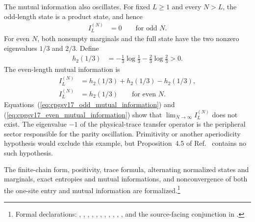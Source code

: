 \documentclass[11pt]{article}
\begin{document}
The mutual information also oscillates. For fixed $L\geq1$ and every $N>L$,
the odd-length state is a product state, and hence
\begin{align}
    I_L^{(N)}
        &= 0
        \qquad\text{for odd $N$}.
    \label{eq:cpgsv17_odd_mutual_information}
\end{align}
For even $N$, both nonempty marginals and the full state have the two nonzero
eigenvalues $1/3$ and $2/3$. Define
\begin{align}
    h_2(1/3)
        &=
        -\frac13\log\frac13
        -\frac23\log\frac23
        >0.
    \label{eq:cpgsv17_binary_entropy_one_third}
\end{align}
The even-length mutual information is
\begin{align}
    I_L^{(N)}
        &=
        h_2(1/3)+h_2(1/3)-h_2(1/3),
    \label{eq:cpgsv17_even_mutual_information_entropy_difference}\\
    I_L^{(N)}
        &= h_2(1/3)
        \qquad\text{for even $N$}.
    \label{eq:cpgsv17_even_mutual_information}
\end{align}
Equations~(\ref{eq:cpgsv17_odd_mutual_information}) and
(\ref{eq:cpgsv17_even_mutual_information}) show that
$\lim_{N\to\infty}I_L^{(N)}$ does not exist. The eigenvalue $-1$ of the
physical-trace transfer operator is the peripheral sector responsible for the
parity oscillation. Primitivity or another aperiodicity hypothesis would
exclude this example, but Proposition~4.5 of
Ref.~\cite{Cirac2016MPDO_arXiv} contains no such hypothesis.

The finite-chain form, positivity, trace formula, alternating normalized
states and marginals, exact entropies and mutual informations, and
nonconvergence of both the one-site entry and mutual information are
formalized.\footnote{Formal declarations:
,
,
,
,
,
,
,
,
,
,
,
and the source-facing conjunction
in .}
\end{document}
